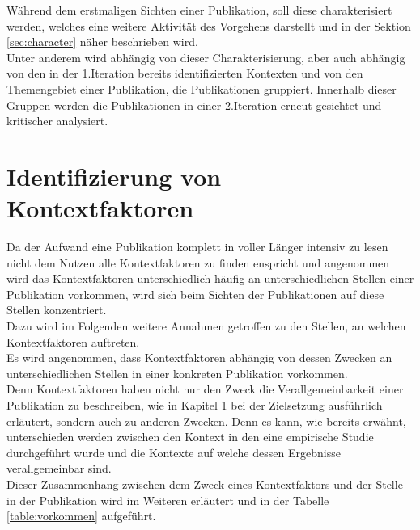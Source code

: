 Während dem erstmaligen Sichten einer Publikation, soll diese charakterisiert werden, welches eine weitere Aktivität des Vorgehens darstellt und in der Sektion \ref{sec:character} näher beschrieben wird.\\

Unter anderem wird abhängig von dieser Charakterisierung, aber auch abhängig von den in der 1.Iteration bereits identifizierten Kontexten und von den Themengebiet einer Publikation, die Publikationen gruppiert. Innerhalb dieser Gruppen werden die Publikationen in einer 2.Iteration erneut gesichtet und kritischer analysiert. \\


\section{Identifizierung von Kontextfaktoren}
Da der Aufwand eine Publikation komplett in voller Länger intensiv zu lesen nicht dem Nutzen alle Kontextfaktoren zu finden enspricht und angenommen wird das Kontextfaktoren unterschiedlich häufig an unterschiedlichen Stellen einer Publikation vorkommen, wird sich beim Sichten der Publikationen auf diese Stellen konzentriert. \\
Dazu wird im Folgenden weitere Annahmen getroffen zu den Stellen, an welchen Kontextfaktoren auftreten. \\

Es wird angenommen, dass Kontextfaktoren abhängig von dessen Zwecken an unterschiedlichen Stellen in einer konkreten Publikation vorkommen. \\
Denn Kontextfaktoren haben nicht nur den Zweck die Verallgemeinbarkeit einer Publikation zu beschreiben, wie in Kapitel 1 bei der Zielsetzung ausführlich erläutert, sondern auch zu anderen Zwecken. Denn es kann, wie bereits erwähnt, unterschieden werden zwischen den Kontext in den eine empirische Studie durchgeführt wurde und die Kontexte auf welche dessen Ergebnisse verallgemeinbar sind. \\
Dieser Zusammenhang zwischen dem Zweck eines Kontextfaktors und der Stelle in der Publikation wird im Weiteren erläutert und in der Tabelle \ref{table:vorkommen} aufgeführt. \\

